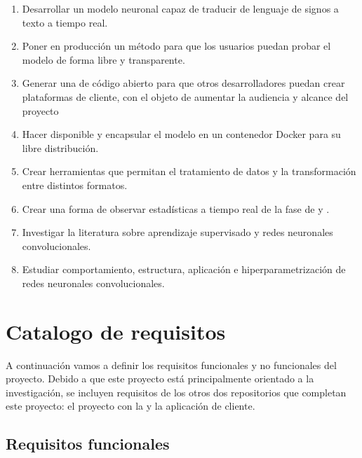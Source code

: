 \begin{enumerate}
  \item Desarrollar un modelo neuronal capaz de traducir de lenguaje de signos a texto a tiempo real.

  \item Poner en producción un método para que los usuarios puedan probar el modelo de forma libre y transparente.

  \item Generar una  de código abierto para que otros desarrolladores puedan crear plataformas de cliente, con el objeto de aumentar la audiencia y alcance del proyecto

  \item Hacer disponible y encapsular el modelo en un contenedor Docker para su libre distribución.

  \item Crear herramientas que permitan el tratamiento de datos y la transformación entre distintos formatos.

  \item Crear una forma de observar estadísticas a tiempo real de la fase de  y .

  \item Investigar la literatura sobre aprendizaje supervisado y redes neuronales convolucionales.

  \item Estudiar comportamiento, estructura, aplicación e hiperparametrización de redes neuronales convolucionales.
\end{enumerate}

\section{Catalogo de requisitos}

A continuación vamos a definir los requisitos funcionales y no funcionales del proyecto. Debido a que este proyecto está principalmente orientado a la investigación, se incluyen requisitos de los otros dos repositorios que completan este proyecto: el proyecto con la  y la aplicación de cliente.

\subsection{Requisitos funcionales}

